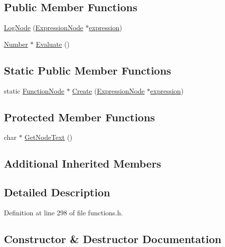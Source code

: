 \subsection*{Public Member Functions}
\begin{DoxyCompactItemize}
\item 
\hyperlink{classLogNode_a6bf6a9d421767f3cf02f0fa2d4dc11a9}{Log\+Node} (\hyperlink{classExpressionNode}{Expression\+Node} $\ast$\hyperlink{classFunctionNode_ad7577b179a1937aaf8a0058bb5b546dc}{expression})
\item 
\hyperlink{structNumber}{Number} $\ast$ \hyperlink{classLogNode_aa8bf2ac5af5a3b9e2f56c80a496beca8}{Evaluate} ()
\end{DoxyCompactItemize}
\subsection*{Static Public Member Functions}
\begin{DoxyCompactItemize}
\item 
static \hyperlink{classFunctionNode}{Function\+Node} $\ast$ \hyperlink{classLogNode_a06ab1d2b9676804d54efed4dca5d3b25}{Create} (\hyperlink{classExpressionNode}{Expression\+Node} $\ast$\hyperlink{classFunctionNode_ad7577b179a1937aaf8a0058bb5b546dc}{expression})
\end{DoxyCompactItemize}
\subsection*{Protected Member Functions}
\begin{DoxyCompactItemize}
\item 
char $\ast$ \hyperlink{classLogNode_a069ab53e0b931eba9e7b6530a3287e40}{Get\+Node\+Text} ()
\end{DoxyCompactItemize}
\subsection*{Additional Inherited Members}


\subsection{Detailed Description}


Definition at line 298 of file functions.\+h.



\subsection{Constructor \& Destructor Documentation}
